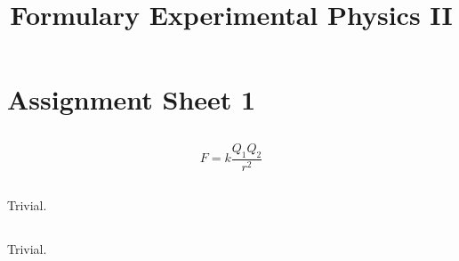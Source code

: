 \documentclass{report}
\title{Formulary Experimental Physics II}
\begin{document}
\chapter{Assignment Sheet 1}

\section{}

\section{}
$$F=k\frac{Q_1 Q_2}{r^2}$$

\section{}

\section{}
Trivial.

\section{}
Trivial.

\chapter{}

\chapter{}

\chapter{}

\chapter{}

\chapter{}

\chapter{}
\end{document}
